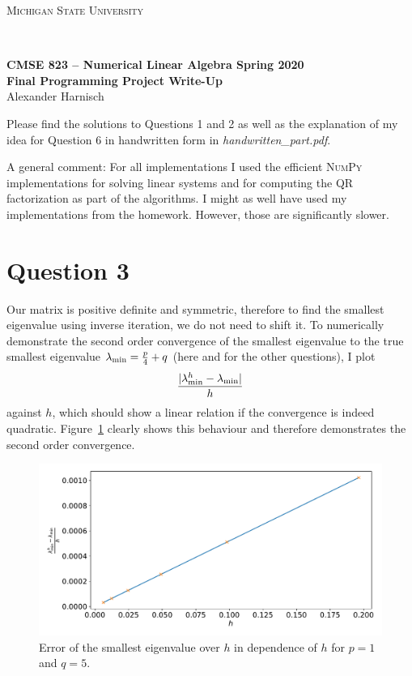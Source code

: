\documentclass[a4paper, 11pt]{article}
\begin{document}
\noindent
\centerline{\small{\textsc{Michigan State University}}} \\
\large{\textbf{CMSE 823 – Numerical Linear Algebra \hfill Spring 2020 \\
Final Programming Project Write-Up} \\
Alexander Harnisch \\
\noindent\makebox[\linewidth]{\rule{\textwidth}{0.4pt}}

Please find the solutions to Questions 1 and 2 as well as the explanation of my
idea for Question 6 in handwritten form in \textit{handwritten\_part.pdf}.

A general comment: For all implementations I used the efficient
\textsc{NumPy} implementations for solving linear systems and for computing the
QR factorization as part of the algorithms. I might as well have used my
implementations from the homework. However, those are significantly slower.

\section*{Question 3}
Our matrix is positive definite and
symmetric, therefore to find the smallest eigenvalue using inverse iteration,
we do not need to shift it. To numerically demonstrate the second order
convergence of the smallest eigenvalue to the true smallest eigenvalue
$\lambda_\textup{min} = \frac{p}{4} + q$ (here and for the other questions), I
plot 
\begin{equation}
  \frac{\vert \lambda_\textup{min}^h - \lambda_\textup{min}\vert}{h}
\end{equation}
against $h$, which should show a linear relation if the convergence is
indeed quadratic. Figure~\ref{fig:3} clearly shows this behaviour and therefore
demonstrates the second order convergence.
\begin{figure}
  \centering
  \includegraphics[width=\textwidth]{../code/3.pdf}
  \caption{Error of the smallest eigenvalue over $h$ in dependence of $h$ for
  $p = 1$ and $q = 5$.}
  \label{fig:3}
\end{figure}

}
\end{document}
